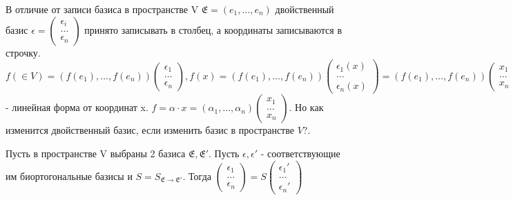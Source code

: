 \begin{note}
	В отличие от записи базиса в пространстве V \(\mathfrak{E} = (e_1, \ldots, e_n)\) двойственный базис \(\mathfrak{\epsilon} = \begin{pmatrix}
		\epsilon_i \\ \ldots \\ \epsilon_n
	\end{pmatrix}\) принято записывать в столбец, а координаты записываются в строчку. \(f(\in V) = (f(e_1), \ldots, f(e_n))\begin{pmatrix}
	\epsilon_1 \\ \ldots \\ \epsilon_n
	\end{pmatrix}, f(x) = (f(e_1), \ldots, f(e_n))\begin{pmatrix}
	\epsilon_1(x) \\ \ldots \\ \epsilon_n(x)
	\end{pmatrix} = (f(e_1), \ldots, f(e_n))\begin{pmatrix}
	x_1 \\ \ldots \\ x_n
	\end{pmatrix} = \sum_{i=1}^{n}f(e_i)x_i\) - линейная форма от координат x. \(f = \alpha \cdot x = (\alpha_1, \ldots, \alpha_n)\begin{pmatrix}
	x_1 \\ \ldots \\ x_n
	\end{pmatrix}\). Но как изменится двойственный базис, если изменить базис в пространстве \(V\)?.
\end{note}
\begin{proposition}
	Пусть в пространстве V выбраны 2 базиса \(\mathfrak{E}, \mathfrak{E}'\). Пусть \(\mathfrak{\epsilon}, \mathfrak{\epsilon}' \) - соответствующие им биортогональные базисы и \(S = S_{\mathfrak{E}\to\mathfrak{E}'}\). Тогда \(\begin{pmatrix}
		\epsilon_1 \\ \ldots \\ \epsilon_n
	\end{pmatrix} = S\begin{pmatrix}
	\epsilon_1' \\ \ldots \\ \epsilon_n'
	\end{pmatrix}\)
\end{proposition}
